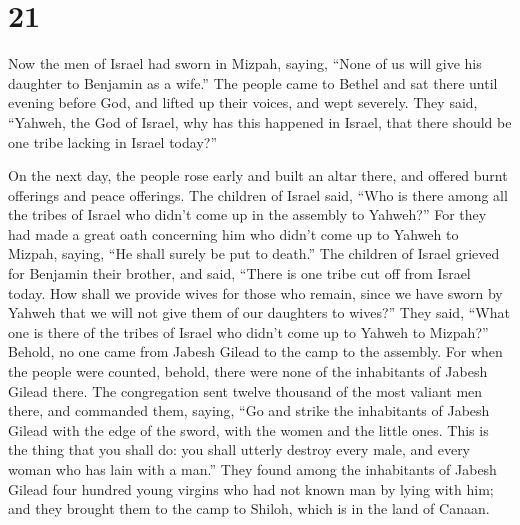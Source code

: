 \hypertarget{section-20}{%
\section{21}\label{section-20}}

 Now the men of Israel had sworn in Mizpah, saying, ``None
of us will give his daughter to Benjamin as a wife.''  The
people came to Bethel and sat there until evening before God, and lifted
up their voices, and wept severely.  They said, ``Yahweh,
the God of Israel, why has this happened in Israel, that there should be
one tribe lacking in Israel today?''

 On the next day, the people rose early and built an altar
there, and offered burnt offerings and peace offerings. 
The children of Israel said, ``Who is there among all the tribes of
Israel who didn't come up in the assembly to Yahweh?'' For they had made
a great oath concerning him who didn't come up to Yahweh to Mizpah,
saying, ``He shall surely be put to death.''  The children
of Israel grieved for Benjamin their brother, and said, ``There is one
tribe cut off from Israel today.  How shall we provide
wives for those who remain, since we have sworn by Yahweh that we will
not give them of our daughters to wives?''  They said,
``What one is there of the tribes of Israel who didn't come up to Yahweh
to Mizpah?'' Behold, no one came from Jabesh Gilead to the camp to the
assembly.  For when the people were counted, behold, there
were none of the inhabitants of Jabesh Gilead there.  The
congregation sent twelve thousand of the most valiant men there, and
commanded them, saying, ``Go and strike the inhabitants of Jabesh Gilead
with the edge of the sword, with the women and the little ones.
 This is the thing that you shall do: you shall utterly
destroy every male, and every woman who has lain with a man.''
 They found among the inhabitants of Jabesh Gilead four
hundred young virgins who had not known man by lying with him; and they
brought them to the camp to Shiloh, which is in the land of Canaan.

